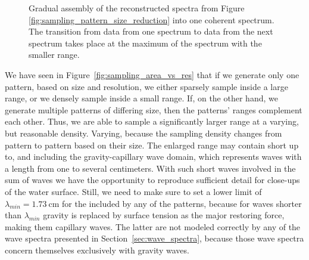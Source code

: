 \begin{figure}[p]
\caption{
Gradual assembly of the reconstructed spectra from Figure
\ref{fig:sampling_pattern_size_reduction} into one coherent spectrum.
The transition from data from one spectrum to data from the next
spectrum takes place at the maximum \wavenumber of the spectrum with the
smaller \wavenumber range.
}
\label{fig:sampling_pattern_assembly}
\end{figure}
%
We have seen in Figure~\ref{fig:sampling_area_vs_res} that if we generate only
one pattern, based on size and resolution, we either sparsely sample inside a
large \wavenumber range, or we densely sample inside a small \wavenumber range.
If, on the other hand, we generate multiple patterns of differing size, then
the patterns' \wavenumbers ranges complement each other. Thus, we are able
to sample a significantly larger \wavenumber range at a varying, but reasonable
density. Varying, because the sampling density changes from pattern to pattern
based on their size.
The enlarged \wavenumber range may contain short \wavelengths up to, and
including the gravity-capillary wave domain, which represents waves with a
length from one to several centimeters. With such short waves involved in the
sum of waves we have the opportunity to reproduce sufficient detail for
close-ups of the water surface. Still, we need to make sure to set a lower
limit of $\lambda_{min} = \SI{1.73}{\centi\metre}$ for the \wavelengths included
by any of the patterns, because for waves shorter than $\lambda_{min}$ gravity is
replaced by surface tension as the major restoring force, making them
capillary waves. The latter are not modeled correctly by any of the wave
spectra presented in Section~\ref{sec:wave_spectra}, because those wave spectra
concern themselves exclusively with gravity waves.

